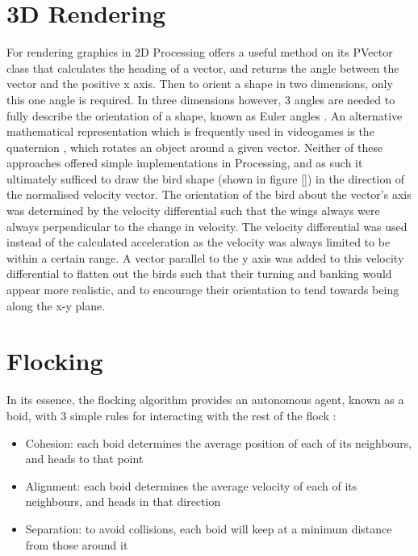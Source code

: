 \documentclass[journal, a4paper]{IEEEtran}
\begin{document}
\section*{3D Rendering}
For rendering graphics in 2D Processing offers a useful method on its PVector class that calculates the heading of a vector, and returns the angle between the vector and the positive x axis. Then to orient a shape in two dimensions, only this one angle is required. In three dimensions however, 3 angles are needed to fully describe the orientation of a shape, known as Euler angles \cite{euler}. An alternative mathematical representation which is frequently used in videogames is the quaternion \cite{quaternion}, which rotates an object around a given vector. Neither of these approaches offered simple implementations in Processing, and as such it ultimately sufficed to draw the bird shape (shown in figure \ref{}) in the direction of the normalised velocity vector. The orientation of the bird about the vector's axis was determined by the velocity differential such that the wings always were always perpendicular to the change in velocity. The velocity differential was used instead of the calculated acceleration as the velocity was always limited to be within a certain range. A vector parallel to the y axis was added to this velocity differential to flatten out the birds such that their turning and banking would appear more realistic, and to encourage their orientation to tend towards being along the x-y plane.

\section*{Flocking}
In its essence, the flocking algorithm provides an autonomous agent, known as a boid, with 3 simple rules for interacting with the rest of the flock \cite{reynolds}:
\begin{itemize}
  \item Cohesion: each boid determines the average position of each of its neighbours, and heads to that point
  \item Alignment: each boid determines the average velocity of each of its neighbours, and heads in that direction
  \item Separation: to avoid collisions, each boid will keep at a minimum distance from those around it
\end{itemize}
\end{document}
